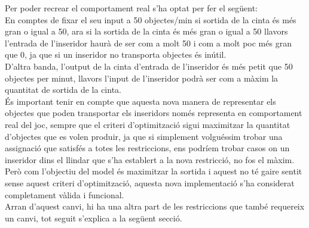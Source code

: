Per poder recrear el comportament real s'ha optat per fer el següent:\\
En comptes de fixar el seu input a 50 objectes/min si sortida de la cinta és més gran o igual a 50, ara si la sortida de la cinta és més gran o igual a 50 llavors l'entrada de l'inseridor haurà de ser com a molt 50 i com a molt poc més gran que 0, ja que si un inseridor no transporta objectes és inútil.\\
D'altra banda, l'output de la cinta d'entrada de l'inseridor és més petit que 50 objectes per minut, llavors l'input de l'inseridor podrà ser com a màxim la quantitat de sortida de la cinta.\\
És important tenir en compte que aquesta nova manera de representar els objectes que poden transportar els inseridors només representa en comportament real del joc, sempre que el criteri d'optimització sigui maximitzar la quantitat d'objectes que es volen produir, ja que si simplement volguéssim trobar una assignació que satisfés a totes les restriccions, ens podríem trobar casos on un inseridor dins el llindar que s'ha establert a la nova restricció, no fos el màxim. Però com l'objectiu del model és maximitzar la sortida i aquest no té gaire sentit sense aquest criteri d'optimització, aquesta nova implementació s'ha considerat completament vàlida i funcional.\\

Arran d'aquest canvi, hi ha una altra part de les restriccions que també requereix un canvi, tot seguit s'explica a la següent secció.

